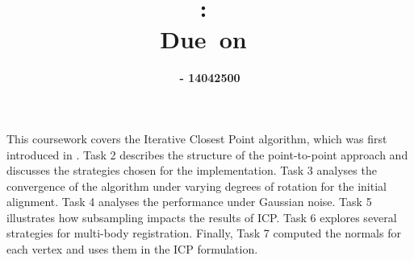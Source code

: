 \documentclass{article}
\title{
\vspace{2in}
\textmd{\textbf{\hmwkClass:\ \hmwkTitle}}\\
\normalsize\vspace{0.1in}\small{Due\ on\ \hmwkDueDate}\\
\vspace{3in}
}
\author{\textbf{\hmwkAuthorName  - 14042500}}
\date{} %
\begin{document}
\maketitle



\newpage

This coursework covers the Iterative Closest Point algorithm, which was first introduced in \cite{basicICP}. Task 2 describes the structure of the point-to-point approach and discusses the strategies chosen for the implementation. Task 3 analyses the convergence of the algorithm under varying degrees of rotation for the initial alignment. Task 4 analyses the performance under Gaussian noise. Task 5 illustrates how subsampling impacts the results of ICP. Task 6 explores several strategies for multi-body registration. Finally, Task 7 computed the normals for each vertex and uses them in the ICP formulation.

\end{document}
